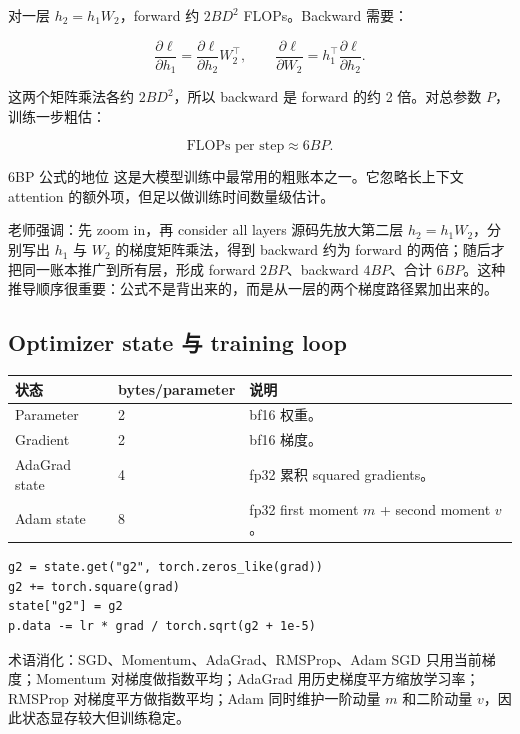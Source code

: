 \documentclass[a4paper]{article}
\begin{document}
对一层 \(h_2=h_1W_2\)，forward 约 \(2BD^2\) FLOPs。Backward 需要：

\[
\frac{\partial \ell}{\partial h_1}
=
\frac{\partial \ell}{\partial h_2}W_2^\top,
\qquad
\frac{\partial \ell}{\partial W_2}
=
h_1^\top\frac{\partial \ell}{\partial h_2}.
\]

这两个矩阵乘法各约 \(2BD^2\)，所以 backward 是 forward 的约 2 倍。对总参数 \(P\)，训练一步粗估：

\[
\text{FLOPs per step}\approx 6BP.
\]

\begin{importantbox}{6BP 公式的地位}
这是大模型训练中最常用的粗账本之一。它忽略长上下文 attention 的额外项，但足以做训练时间数量级估计。
\end{importantbox}

\begin{knowledgebox}{老师强调：先 zoom in，再 consider all layers}
源码先放大第二层 \(h_2=h_1W_2\)，分别写出 \(h_1\) 与 \(W_2\) 的梯度矩阵乘法，得到 backward 约为 forward 的两倍；随后才把同一账本推广到所有层，形成 forward \(2BP\)、backward \(4BP\)、合计 \(6BP\)。这种推导顺序很重要：公式不是背出来的，而是从一层的两个梯度路径累加出来的。
\end{knowledgebox}

\subsection{Optimizer state 与 training loop}

\begin{longtable}{p{}p{}p{}}
\toprule
\textbf{状态} & \textbf{bytes/parameter} & \textbf{说明} \\
\midrule
Parameter & 2 & bf16 权重。 \\
Gradient & 2 & bf16 梯度。 \\
AdaGrad state & 4 & fp32 累积 squared gradients。 \\
Adam state & 8 & fp32 first moment \(m\) + second moment \(v\)。 \\
\bottomrule
\end{longtable}

\begin{lstlisting}[caption={AdaGrad optimizer 的核心状态}]
g2 = state.get("g2", torch.zeros_like(grad))
g2 += torch.square(grad)
state["g2"] = g2
p.data -= lr * grad / torch.sqrt(g2 + 1e-5)
\end{lstlisting}

\begin{knowledgebox}{术语消化：SGD、Momentum、AdaGrad、RMSProp、Adam}
SGD 只用当前梯度；Momentum 对梯度做指数平均；AdaGrad 用历史梯度平方缩放学习率；RMSProp 对梯度平方做指数平均；Adam 同时维护一阶动量 \(m\) 和二阶动量 \(v\)，因此状态显存较大但训练稳定。
\end{knowledgebox}
\end{document}
